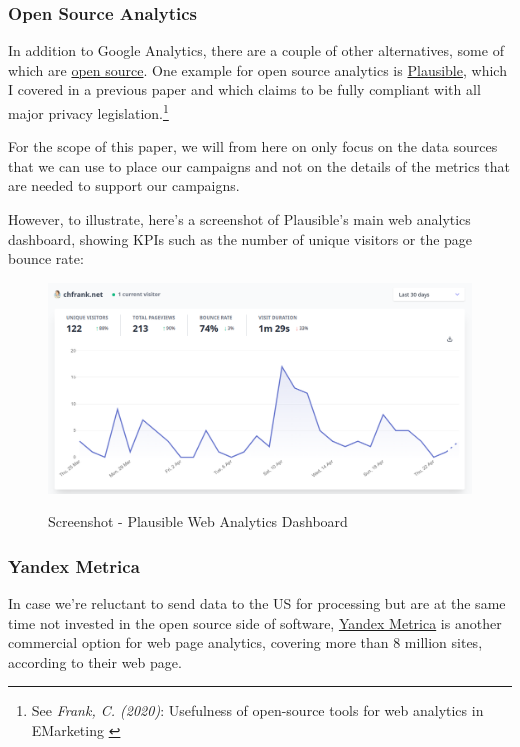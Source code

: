 \subsubsection{Open Source Analytics}

In addition to Google Analytics, there are a couple of other alternatives, some of which are \href{https://opensource.org/osd}{open source}. One example for open source analytics is \href{https://plausible.io/}{Plausible}, which I covered in a previous paper and which claims to be fully compliant with all major privacy legislation.\footnote{See \textit{Frank, C. (2020)}: Usefulness of open-source tools for web analytics in EMarketing \cite{previousPaper}} 

For the scope of this paper, we will from here on only focus on the data sources that we can use to place our campaigns and not on the details of the metrics that are needed to support our campaigns.

However, to illustrate, here's a screenshot of Plausible's main web analytics dashboard, showing KPIs such as the number of unique visitors or the page bounce rate:

\begin{figure}[H]
\centering
\caption {Screenshot - Plausible Web Analytics Dashboard}
\includegraphics[width=\linewidth]{images/plausible.png}
\label{fig:plausible}
\end{figure}

\subsubsection{Yandex Metrica}

In case we're reluctant to send data to the US for processing but are at the same time not invested in the open source side of software, \href{https://metrica.yandex.com/}{Yandex Metrica} is another commercial option for web page analytics, covering more than 8 million sites, according to their web page.

